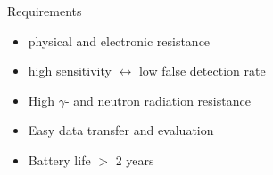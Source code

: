 \documentclass{beamer}
\begin{document}
    \begin{frame}{Requirements}
        
        \begin{itemize}
            \item physical and electronic resistance
            \item high sensitivity $\leftrightarrow$ low false detection rate
            \item High $\gamma$- and neutron radiation resistance
            \item Easy data transfer and evaluation
            \item Battery life $>$ 2 years
        \end{itemize}
        
    \end{frame}
    
\end{document}
